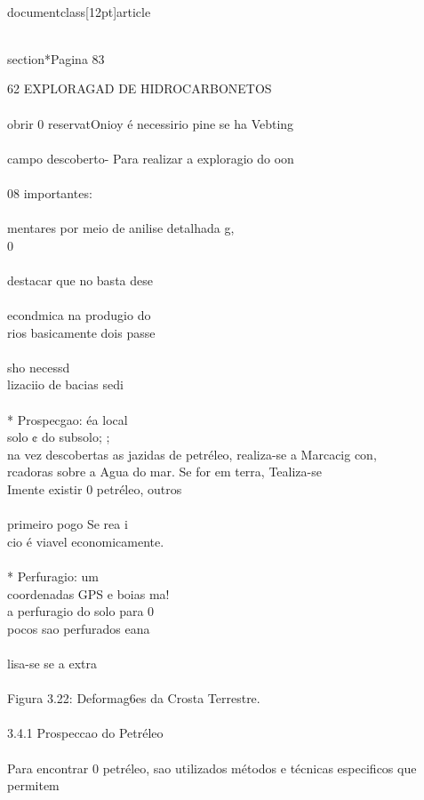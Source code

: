 \\documentclass[12pt]{article}
\begin{document}
{\\section*{Pagina 83}

62 EXPLORAGAD DE HIDROCARBONETOS\\
\\
obrir 0 reservatOnioy é necessirio pine se ha Vebting\\
\\
campo descoberto- Para realizar a exploragio do oon\\
\\
08 importantes:\\
\\
mentares por meio de anilise detalhada g,\\
0\\
\\
destacar que no basta dese\\
\\
econdmica na produgio do\\
rios basicamente dois passe\\
\\
sho necessd\\
lizaciio de bacias sedi\\
\\
* Prospecgao: éa local\\
solo ¢ do subsolo; ;\\
na vez descobertas as jazidas de petréleo, realiza-se a Marcacig con,\\
rcadoras sobre a Agua do mar. Se for em terra, Tealiza-se\\
Imente existir 0 petréleo, outros\\
\\
primeiro pogo Se rea i\\
cio é viavel economicamente.\\
\\
* Perfuragio: um\\
coordenadas GPS e boias ma!\\
a perfuragio do solo para 0\\
pocos sao perfurados eana\\
\\
lisa-se se a extra\\
\\
Figura 3.22: Deformag6es da Crosta Terrestre.\\
\\
3.4.1 Prospeccao do Petréleo\\
\\
Para encontrar 0 petréleo, sao utilizados métodos e técnicas especificos que permitem\\
}
\end{document}
